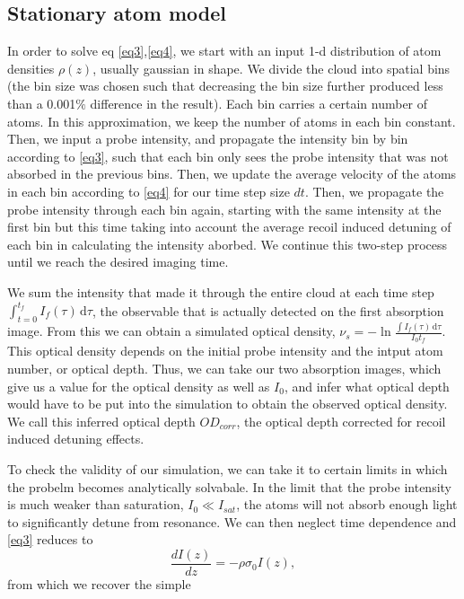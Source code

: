\documentclass[12pt]{iopart}
\begin{document}
\subsection{Stationary atom model}
In order to solve eq \ref{eq3},\ref{eq4}, we start with an input 1-d distribution of atom densities $\rho(z)$, usually gaussian in shape. We divide the cloud into spatial bins (the bin size was chosen such that decreasing the bin size further produced less than a 0.001$\%$ difference in the result).   Each bin carries a certain number of atoms. In this approximation, we keep the number of atoms in each bin constant. Then, we input a probe intensity, and propagate the intensity bin by bin according to \ref{eq3}, such that each bin only sees the probe intensity that was not absorbed in the previous bins. Then, we update the average velocity of the atoms in each bin according to \ref{eq4} for our time step size $dt$.  Then, we propagate the probe intensity through each bin again, starting with the same intensity at the first bin but this time taking into account the average recoil induced detuning of each bin in calculating the intensity aborbed. We continue this two-step process until we reach the desired imaging time.
\par We sum the intensity that made it through the entire cloud at each time step $\int_{t=0}^{t_f} I_f (\tau)\,\mathrm{d}\tau$, the observable that is actually detected on the first absorption image.  From this we can obtain a simulated optical density, $\nu _s = -\ln{\frac{\int I_f (\tau)\,\mathrm{d}\tau}{I_0 t_f}}$. This optical density depends on the initial probe intensity and the intput atom number, or optical depth. Thus, we can take our two absorption images, which give us a value for the optical density as well as $I_0$, and infer what optical depth would have to be put into the simulation to obtain the observed optical density. We call this inferred optical depth $OD_{corr}$, the optical depth corrected for recoil induced detuning effects.  
\par To check the validity of our simulation, we can take it to certain limits in which the probelm becomes analytically solvabale. In the limit that the probe intensity is much weaker than saturation, $I_0\ll I_{sat}$, the atoms will not absorb enough light to significantly detune from resonance. We can then neglect time dependence and \ref{eq3} reduces to 
\begin{equation}
\frac{dI(z)}{dz}=-\rho\sigma_0 I(z),
\end{equation}
from which we recover the simple
\end{document}
